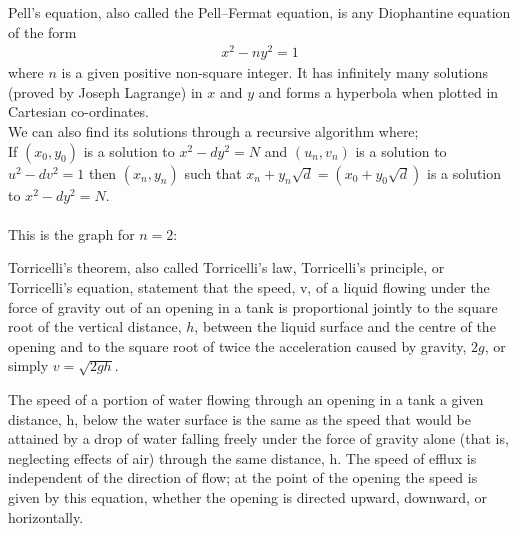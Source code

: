 \begin{mathbox}{}
{Pell's equation, also called the Pell–Fermat equation, is any Diophantine equation of the form 
\begin{align*}
x^{2}-ny^{2}=1
\end{align*}
where $n$ is a given positive non-square integer. It has infinitely many solutions (proved by Joseph Lagrange) in $x$ and $y$ and forms a hyperbola when plotted in Cartesian co-ordinates.\\
We can also find its solutions through a recursive algorithm where;\\
If $(x_{0},y_{0})$ is a solution to $x^{2}-dy^{2}=N$ and $(u_{n},v_{n})$ is a solution to $u^{2}-dv^{2}=1$ then $(x_n,y_n)$ such that $x_n+y_n \sqrt{d}=(x_{0}+y_{0}{\sqrt{d}})$ is a solution to $x^{2}-dy^{2}=N.$\\\\
This is the graph for $n = 2$:
\begin{center}
\end{center}}
\end{mathbox}
\begin{phybox}{}
    {Torricelli’s theorem, also called Torricelli’s law, Torricelli’s principle, or Torricelli’s equation, statement that the speed, v, of a liquid flowing under the force of gravity out of an opening in a tank is proportional jointly to the square root of the vertical distance, $h$, between the liquid surface and the centre of the opening and to the square root of twice the acceleration caused by gravity, $2g$, or simply $v = \sqrt{2gh}$.
    
    The speed of a portion of water flowing through an opening in a tank a given distance, h, below the water surface is the same as the speed that would be attained by a drop of water falling freely under the force of gravity alone (that is, neglecting effects of air) through the same distance, h. The speed of efflux is independent of the direction of flow; at the point of the opening the speed is given by this equation, whether the opening is directed upward, downward, or horizontally.}
\end{phybox}
